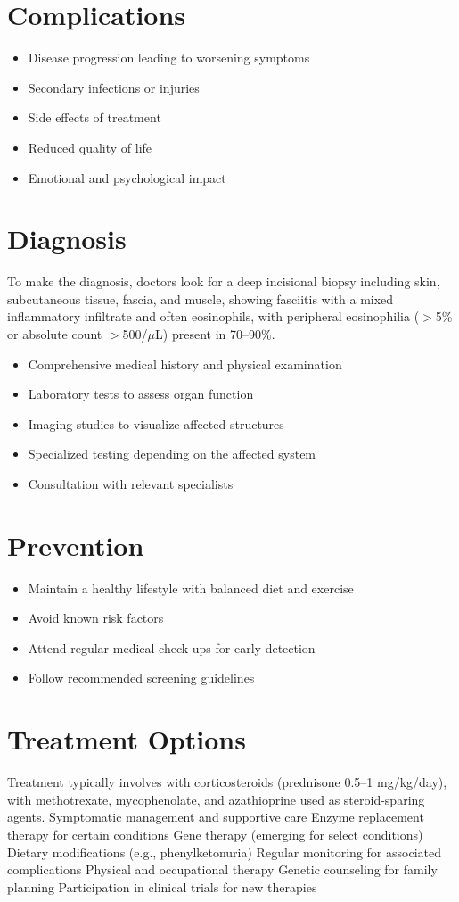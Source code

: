 \section{Complications}
\begin{itemize}[noitemsep]
  \item Disease progression leading to worsening symptoms
  \item Secondary infections or injuries
  \item Side effects of treatment
  \item Reduced quality of life
  \item Emotional and psychological impact
\end{itemize}
\section{Diagnosis}
To make the diagnosis, doctors look for a deep incisional biopsy including skin, subcutaneous tissue, fascia, and muscle, showing fasciitis with a mixed inflammatory infiltrate and often eosinophils, with peripheral eosinophilia ($>$5\% or absolute count $>$500/$\mu$L) present in 70--90\%.

\begin{itemize}[noitemsep]
  \item Comprehensive medical history and physical examination
  \item Laboratory tests to assess organ function
  \item Imaging studies to visualize affected structures
  \item Specialized testing depending on the affected system
  \item Consultation with relevant specialists
\end{itemize}
\section{Prevention}
\begin{itemize}[noitemsep]
  \item Maintain a healthy lifestyle with balanced diet and exercise
  \item Avoid known risk factors
  \item Attend regular medical check-ups for early detection
  \item Follow recommended screening guidelines
\end{itemize}
\section{Treatment Options}
Treatment typically involves with corticosteroids (prednisone 0.5--1 mg/kg/day), with methotrexate, mycophenolate, and azathioprine used as steroid-sparing agents. Symptomatic management and supportive care Enzyme replacement therapy for certain conditions Gene therapy (emerging for select conditions) Dietary modifications (e.g., phenylketonuria) Regular monitoring for associated complications Physical and occupational therapy Genetic counseling for family planning Participation in clinical trials for new therapies

